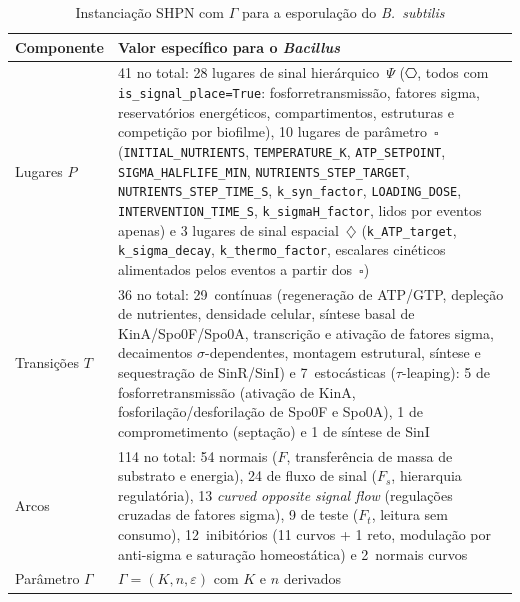 \begin{table}[htbp]
\centering
\caption{Instanciação SHPN com $\Gamma$ para a esporulação do
\textit{B.~subtilis}}
\label{tab:instanciacao-bacillus}
\small
\begin{tabular}{@{}lp{8.2cm}@{}}
\toprule
\textbf{Componente} & \textbf{Valor específico para o \textit{Bacillus}} \\
\midrule
Lugares $P$ & 41 no total: 28 lugares de sinal hierárquico~$\Psi$ ($\hexagon$,
             todos com \texttt{is\_signal\_place=True}:
             fosforretransmissão, fatores sigma, reservatórios
             energéticos, compartimentos, estruturas e competição
             por biofilme), 10 lugares de parâmetro~$\square$
             (\texttt{INITIAL\_NUTRIENTS}, \texttt{TEMPERATURE\_K},
             \texttt{ATP\_SETPOINT}, \texttt{SIGMA\_HALFLIFE\_MIN},
             \texttt{NUTRIENTS\_STEP\_TARGET},
             \texttt{NUTRIENTS\_STEP\_TIME\_S},
             \texttt{k\_syn\_factor}, \texttt{LOADING\_DOSE},
             \texttt{INTERVENTION\_TIME\_S}, \texttt{k\_sigmaH\_factor},
             lidos por eventos apenas)
             e 3 lugares de sinal espacial~$\diamondsuit$
             (\texttt{k\_ATP\_target}, \texttt{k\_sigma\_decay},
             \texttt{k\_thermo\_factor}, escalares cinéticos
             alimentados pelos eventos a partir dos~$\square$) \\
Transições $T$ & 36 no total: 29~contínuas (regeneração de ATP/GTP,
                depleção de nutrientes, densidade celular,
                síntese basal de KinA/Spo0F/Spo0A, transcrição e
                ativação de fatores sigma, decaimentos
                $\sigma$-dependentes, montagem estrutural,
                síntese e sequestração de SinR/SinI) e
                7~estocásticas ($\tau$-leaping):
                5 de fosforretransmissão (ativação de KinA,
                fosforilação/desforilação de Spo0F e Spo0A),
                1 de comprometimento (septação) e
                1 de síntese de SinI \\
Arcos & 114 no total: 54 normais ($F$, transferência de massa de
        substrato e energia), 24 de fluxo de sinal ($F_s$,
        hierarquia regulatória), 13 \textit{curved opposite
        signal flow} (regulações cruzadas de fatores sigma),
        9 de teste ($F_t$, leitura sem consumo), 12~inibitórios
        (11 curvos + 1 reto, modulação por anti-sigma e
        saturação homeostática)
        e 2~normais curvos \\
Parâmetro $\Gamma$ & $\Gamma = (K, n, \varepsilon)$ com $K$ e $n$ derivados

\end{tabular}
\end{table}
